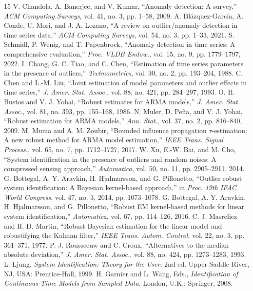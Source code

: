 \documentclass[journal]{IEEEtran}
\begin{document}
\begin{thebibliography}{15}
 V. Chandola, A. Banerjee, and V. Kumar, ``Anomaly detection: A survey,'' \emph{ACM Computing Surveys}, vol. 41, no. 3, pp. 1--58, 2009.
 A. Bl\'azquez-Garc\'ia, A. Conde, U. Mori, and J. A. Lozano, ``A review on outlier/anomaly detection in time series data,'' \emph{ACM Computing Surveys}, vol. 54, no. 3, pp. 1--33, 2021.
 S. Schmidl, P. Wenig, and T. Papenbrock, ``Anomaly detection in time series: A comprehensive evaluation,'' \emph{Proc. VLDB Endow.}, vol. 15, no. 9, pp. 1779--1797, 2022.
 I. Chang, G. C. Tiao, and C. Chen, ``Estimation of time series parameters in the presence of outliers,'' \emph{Technometrics}, vol. 30, no. 2, pp. 193--204, 1988.
 C. Chen and L.-M. Liu, ``Joint estimation of model parameters and outlier effects in time series,'' \emph{J. Amer. Stat. Assoc.}, vol. 88, no. 421, pp. 284--297, 1993.
 O. H. Bustos and V. J. Yohai, ``Robust estimates for ARMA models,'' \emph{J. Amer. Stat. Assoc.}, vol. 81, no. 393, pp. 155--168, 1986.
 N. Muler, D. Pe\~na, and V. J. Yohai, ``Robust estimation for ARMA models,'' \emph{Ann. Stat.}, vol. 37, no. 2, pp. 816--840, 2009.
 M. Muma and A. M. Zoubir, ``Bounded influence propagation $\tau$-estimation: A new robust method for ARMA model estimation,'' \emph{IEEE Trans. Signal Process.}, vol. 65, no. 7, pp. 1712--1727, 2017.
 W. Xu, E.-W. Bai, and M. Cho, ``System identification in the presence of outliers and random noises: A compressed sensing approach,'' \emph{Automatica}, vol. 50, no. 11, pp. 2905--2911, 2014.
 G. Bottegal, A. Y. Aravkin, H. Hjalmarsson, and G. Pillonetto, ``Outlier robust system identification: A Bayesian kernel-based approach,'' in \emph{Proc. 19th IFAC World Congress}, vol. 47, no. 3, 2014, pp. 1073--1078.
 G. Bottegal, A. Y. Aravkin, H. Hjalmarsson, and G. Pillonetto, ``Robust EM kernel-based methods for linear system identification,'' \emph{Automatica}, vol. 67, pp. 114--126, 2016.
 C. J. Masreliez and R. D. Martin, ``Robust Bayesian estimation for the linear model and robustifying the Kalman filter,'' \emph{IEEE Trans. Autom. Control}, vol. 22, no. 3, pp. 361--371, 1977.
 P. J. Rousseeuw and C. Croux, ``Alternatives to the median absolute deviation,'' \emph{J. Amer. Stat. Assoc.}, vol. 88, no. 424, pp. 1273--1283, 1993.
 L. Ljung, \emph{System Identification: Theory for the User}, 2nd ed. Upper Saddle River, NJ, USA: Prentice-Hall, 1999.
 H. Garnier and L. Wang, Eds., \emph{Identification of Continuous-Time Models from Sampled Data}. London, U.K.: Springer, 2008.
\end{thebibliography}
\end{document}
